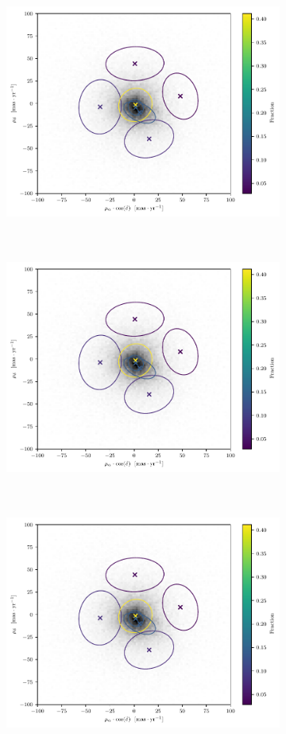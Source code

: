 \begin{figure}[ht!]
    \centering
    \begin{subfigure}[t]{0.48\textwidth}
        \includegraphics[page=2,height=8cm,width=\textwidth]{background/Figures/Field_GMM.pdf}
        \caption{}
    \end{subfigure}
    \begin{subfigure}[t]{0.48\textwidth}
      \includegraphics[page=3,height=8cm,width=\textwidth]{background/Figures/Field_GMM.pdf}
        \caption{}
    \end{subfigure}
     \begin{subfigure}[t]{0.48\textwidth}
      \includegraphics[page=4,height=8cm,width=\textwidth]{background/Figures/Field_GMM.pdf}

\end{subfigure}
\end{figure}

